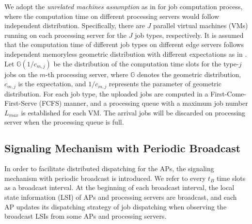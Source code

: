 We adopt the \emph{unrelated machines assumption} as in \cite{tan-online} for job computation process, where the computation time on different processing servers would follow independent distribution.
Specifically, there are $J$ parallel virtual machines (VMs) running on each processing server for the $J$ job types, respectively.
It is assumed that the computation time of different job types on different edge servers follows independent memoryless geometric distribution 
with different expectations as in \cite{TOWC18-HuangKb}.
Let $\mathbb{G}(1/c_{m,j})$ be the distribution of the computation time slots for the type-$j$ jobs on the $m$-th processing server, where $\mathbb{G}$ denotes the geometric distribution, $c_{m,j}$ is the expectation, and {$1/c_{m,j}$ represents the parameter of geometric distribution}.
For each job type, the uploaded jobs are computed in a First-Come-First-Serve (FCFS) manner, and a processing queue with a maximum job number $L_{max}$ is established for each VM.
The arrival jobs will be discarded on processing server when the processing queue is full.
\subsection{{Signaling Mechanism with Periodic Broadcast}}
\label{subsec:broadcast}
In order to facilitate distributed dispatching for the APs, the signaling mechanism with periodic broadcast is introduced.
We refer to every $t_B$ time slots as a broadcast interval.
At the beginning of each broadcast interval, the local state information (LSI) of APs and processing servers are broadcast, and each AP updates its dispatching strategy of job dispatching when observing the broadcast LSIs from some APs and processing servers.
%

